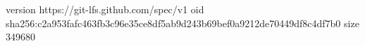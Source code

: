 version https://git-lfs.github.com/spec/v1
oid sha256:c2a953fafc463fb3c96e35ce8df5ab9d243b69bef0a9212de70449df8c4df7b0
size 349680
